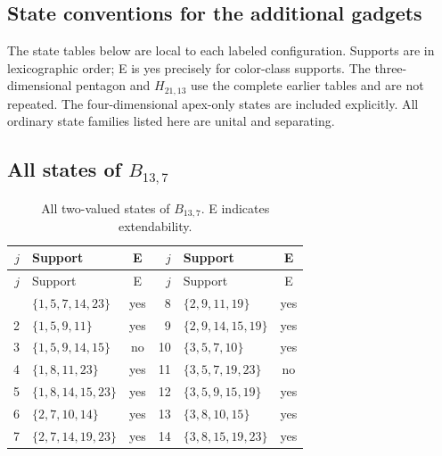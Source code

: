 \documentclass[aps,pra,reprint,superscriptaddress,longbibliography,nofootinbib,floatfix,10pt]{revtex4-2}
\theoremstyle{definition}
\begin{document}
\subsection{State conventions for the additional gadgets}
The state tables below are local to each labeled configuration. Supports
are in lexicographic order; E is yes precisely for color-class supports.
The three-dimensional pentagon and $H_{21,13}$ use the complete earlier
tables and are not repeated. The four-dimensional apex-only states are
included explicitly. All ordinary state families listed here are unital
and separating.
\subsection{All states of \texorpdfstring{$B_{13,7}$}{gadget 3b}}
\begingroup\footnotesize\setlength{\tabcolsep}{3pt}\setlength{\LTpre}{5pt}\setlength{\LTpost}{8pt}
\begin{longtable}{rlc@{\qquad}rlc}
\caption{All two-valued states of $B_{13,7}$. E indicates extendability.}\label{tab:states-3b}\\\toprule $j$ & Support & E & $j$ & Support & E\\\midrule\endfirsthead
\toprule $j$ & Support & E & $j$ & Support & E\\\midrule\endhead\bottomrule\endfoot
1 & $\{1,\allowbreak 5,\allowbreak 7,\allowbreak 14,\allowbreak 23\}$ & yes & 8 & $\{2,\allowbreak 9,\allowbreak 11,\allowbreak 19\}$ & yes\\
2 & $\{1,\allowbreak 5,\allowbreak 9,\allowbreak 11\}$ & yes & 9 & $\{2,\allowbreak 9,\allowbreak 14,\allowbreak 15,\allowbreak 19\}$ & yes\\
3 & $\{1,\allowbreak 5,\allowbreak 9,\allowbreak 14,\allowbreak 15\}$ & no & 10 & $\{3,\allowbreak 5,\allowbreak 7,\allowbreak 10\}$ & yes\\
4 & $\{1,\allowbreak 8,\allowbreak 11,\allowbreak 23\}$ & yes & 11 & $\{3,\allowbreak 5,\allowbreak 7,\allowbreak 19,\allowbreak 23\}$ & no\\
5 & $\{1,\allowbreak 8,\allowbreak 14,\allowbreak 15,\allowbreak 23\}$ & yes & 12 & $\{3,\allowbreak 5,\allowbreak 9,\allowbreak 15,\allowbreak 19\}$ & yes\\
6 & $\{2,\allowbreak 7,\allowbreak 10,\allowbreak 14\}$ & yes & 13 & $\{3,\allowbreak 8,\allowbreak 10,\allowbreak 15\}$ & yes\\
7 & $\{2,\allowbreak 7,\allowbreak 14,\allowbreak 19,\allowbreak 23\}$ & yes & 14 & $\{3,\allowbreak 8,\allowbreak 15,\allowbreak 19,\allowbreak 23\}$ & yes\\
\end{longtable}\endgroup
\end{document}
